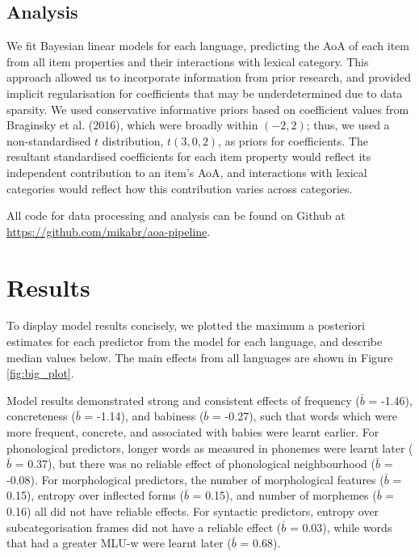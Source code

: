 \documentclass[10pt, letterpaper]{article}
\begin{document}
\subsection{Analysis}\label{analysis}

We fit Bayesian linear models for each language, predicting the AoA of
each item from all item properties and their interactions with lexical
category. This approach allowed us to incorporate information from prior
research, and provided implicit regularisation for coefficients that may
be underdetermined due to data sparsity. We used conservative
informative priors based on coefficient values from Braginsky et al.
(2016), which were broadly within \((-2, 2)\); thus, we used a
non-standardised \(t\) distribution, \(t(3, 0, 2)\), as priors for
coefficients. The resultant standardised coefficients for each item
property would reflect its independent contribution to an item's AoA,
and interactions with lexical categories would reflect how this
contribution varies across categories.

All code for data processing and analysis can be found on Github at
\url{https://github.com/mikabr/aoa-pipeline}.

\section{Results}\label{results}

To display model results concisely, we plotted the maximum a posteriori
estimates for each predictor from the model for each language, and
describe median values below. The main effects from all languages are
shown in Figure \ref{fig:big_plot}.

Model results demonstrated strong and consistent effects of frequency
(\(\bar{b}\) = -1.46), concreteness (\(\bar{b}\) = -1.14), and babiness
(\(\bar{b}\) = -0.27), such that words which were more frequent,
concrete, and associated with babies were learnt earlier. For
phonological predictors, longer words as measured in phonemes were
learnt later (\(\bar{b}\) = 0.37), but there was no reliable effect of
phonological neighbourhood (\(\bar{b}\) = -0.08). For morphological
predictors, the number of morphological features (\(\bar{b}\) = 0.15),
entropy over inflected forms (\(\bar{b}\) = 0.15), and number of
morphemes (\(\bar{b}\) = 0.16) all did not have reliable effects. For
syntactic predictors, entropy over subcategorisation frames did not have
a reliable effect (\(\bar{b}\) = 0.03), while words that had a greater
MLU-w were learnt later (\(\bar{b}\) = 0.68).
\end{document}
